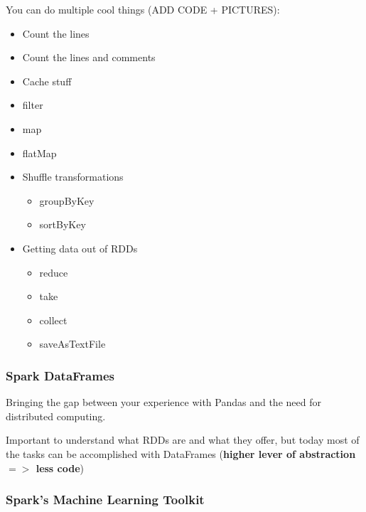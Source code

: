 You can do multiple cool things (ADD CODE + PICTURES):
\begin{itemize}
 \item Count the lines
 \item Count the lines and comments
 \item Cache stuff
 \item filter
 \item map 
 \item flatMap
 \item Shuffle transformations
 \begin{itemize}
  \item groupByKey
  \item sortByKey
 \end{itemize}
 \item Getting data out of RDDs
 \begin{itemize}
  \item reduce
  \item take
  \item collect
  \item saveAsTextFile
 \end{itemize}
\end{itemize}

\subsubsection{Spark DataFrames}

Bringing the gap between your experience with Pandas and the need for distributed computing. 

Important to understand what RDDs are and what they offer, but today most of the tasks can be accomplished with DataFrames ({\bf higher lever of abstraction $=>$ less code})

\subsubsection{Spark's Machine Learning Toolkit}

